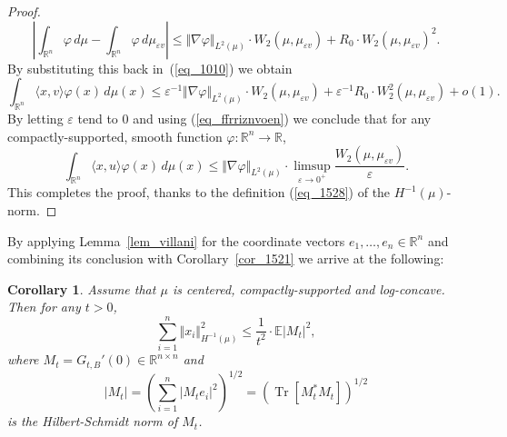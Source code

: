 \documentclass[12pt,a4paper]{article}
\newcommand{\tr}{\mathop{\mathrm{Tr}}\nolimits}
\newcommand{\E}{\mathbb{E}}
\newcommand{\RR}{\mathbb{R}}
\newcommand{\R}{\mathbb{R}}
\renewcommand{\epsilon}{\varepsilon}
\renewcommand{\phi}{\varphi}
\newtheorem{corollary}[theorem]{Corollary}
\theoremstyle{definition}
\begin{document}
\begin{proof}
$$ \left\vert \int_{\R^n} \phi \, d \mu
- \int_{\R^n} \phi \, d\mu_{\epsilon v} \right\vert 
\leq  \Vert \nabla \phi \Vert_{L^2(\mu)}
\cdot W_2 (\mu , \mu_{\epsilon v} ) + R_0 \cdot W_2 (\mu , \mu_{\epsilon v} )^2. $$
By substituting this back in~(\ref{eq_1010}) we obtain 
\[
\int_{\R^n} \langle x,v\rangle \phi (x) \, d \mu(x)
\leq \epsilon^{-1} \Vert \nabla \phi \Vert_{L^2 (\mu)}
\cdot W_2 (\mu , \mu_{\epsilon v} )+ \epsilon^{-1} R_0
\cdot W_2^2 (\mu, \mu_{\epsilon v} ) + o (1) .
\]
By letting $\epsilon$ tend to $0$ and using (\ref{eq_ffrriznvoen})  we conclude that
for any compactly-supported, smooth function $\phi: \RR^n \rightarrow \RR$,
\[
\int_{\R^n} \langle x,u\rangle \phi (x) \, d \mu(x)
\leq \Vert \nabla \phi \Vert_{ L^2 (\mu) } \cdot
\limsup_{\epsilon \to 0^+} \frac{ W_2 ( \mu , \mu_{\epsilon v} ) }{\epsilon}.
\]
This completes the proof, thanks to the definition (\ref{eq_1528}) of 
the $H^{-1}(\mu)$-norm.
\end{proof}
%
By applying Lemma~\ref{lem_villani}
for the coordinate vectors $e_1,\dotsc,e_n \in \RR^n$
and combining its conclusion with Corollary~\ref{cor_1521} we
arrive at the following:
%
\begin{corollary} \label{cor_4701}
Assume that $\mu$ is centered, compactly-supported and log-concave. Then for any $t > 0$,
\[
\sum_{i=1}^n \Vert x_i \Vert_{H^{-1}(\mu)}^2
\leq \frac 1{t^2} \cdot \E \vert M_t \vert^2, 
\]
where $M_t = G_{t,B}'(0) \in \RR^{n \times n}$ and
\[
\vert M_t \vert = \left(\sum_{i=1}^n \vert M_t e_i\vert^2 \right)^{1/2} = \left( \tr[ M_t^* M_t ] \right)^{1/2}
\]
is the Hilbert-Schmidt norm of $M_t$.
\end{corollary}
%
\end{document}

